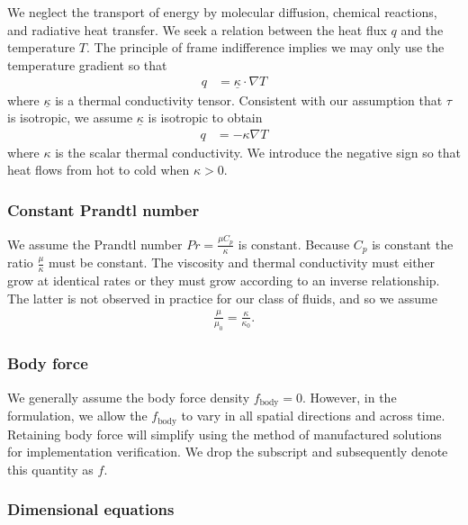 \documentclass[letterpaper,11pt,nointlimits,reqno]{amsart}
\begin{document}
We neglect the transport of energy by molecular diffusion, chemical
reactions, and radiative heat transfer.  We seek a relation between
the heat flux $q$ and the temperature $T$.  The principle of 
frame indifference implies we may only use the temperature gradient
so that
\begin{align}
  \label{eq:fouriertensorlaw}
  q &= \underline{\kappa} \cdot \nabla{} T
\end{align}
where $\underline{\kappa}$ is a thermal conductivity tensor.  
Consistent with our assumption that $\tau$ is isotropic, we assume
$\underline{\kappa}$ is isotropic to obtain 
\begin{align}
  \label{eq:fourierlaw}
  q &= - \kappa \nabla{} T
\end{align}
where $\kappa$ is the scalar thermal conductivity.  We introduce the
negative sign so that heat flows from hot to cold when $\kappa>0$.

\subsubsection{Constant Prandtl number}

We assume the Prandtl number $Pr = \frac{\mu{}C_{p}}{\kappa}$ is constant.
Because $C_{p}$ is constant the ratio $\frac{\mu}{\kappa}$ must be
constant.  The viscosity and thermal conductivity must either grow at
identical rates or they must grow according to an inverse relationship.
The latter is not observed in practice for our class of fluids, and
so we assume
\begin{align}
  \frac{\mu}{\mu_{0}} = \frac{\kappa}{\kappa_{0}}
  .
  \label{eq:mukappa}
\end{align}

\subsubsection{Body force}

We generally assume the body force density $f_{\text{body}}=0$.  However,
in the formulation, we allow the $f_{\text{body}}$ to vary in all spatial
directions and across time.  Retaining body force will simplify using
the method of manufactured solutions for implementation verification.
We drop the subscript and subsequently denote this quantity as $f$.

\subsubsection{Dimensional equations}
\end{document}
